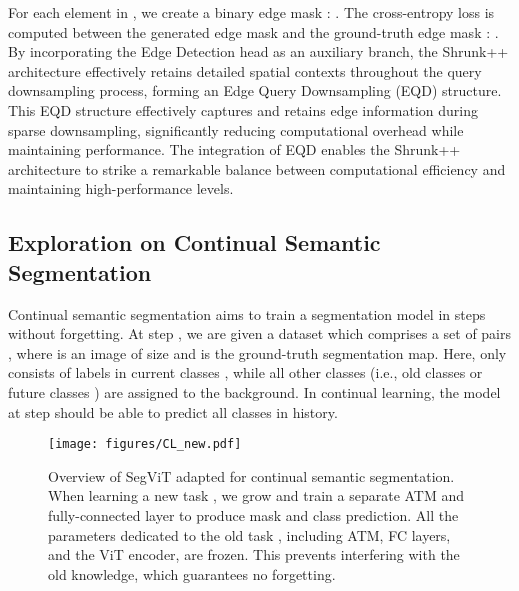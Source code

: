 For each element  in , we create a binary edge mask : .
The cross-entropy loss is computed between the generated edge mask  and the ground-truth edge mask :
.
By incorporating the Edge Detection head as an auxiliary branch, the Shrunk++ architecture effectively retains detailed spatial contexts throughout the query downsampling process, forming an Edge Query Downsampling (EQD) structure. This EQD structure effectively captures and retains edge information during sparse downsampling, significantly reducing computational overhead while maintaining performance.
The integration of EQD enables the Shrunk++ architecture to strike a remarkable balance between computational efficiency and maintaining high-performance levels.







\subsection{Exploration on Continual Semantic Segmentation}

Continual semantic segmentation aims to train a segmentation model in  steps without forgetting. At step , we are given a dataset  which comprises a set of pairs , 
where  is an image of size  and   is the ground-truth segmentation map.
Here,  only consists of labels in current classes , while all other classes (i.e., old classes  or future classes ) are assigned to the background. In continual learning, the model at step  should be able to predict all classes  in history.

\begin{figure*}[h]
    \centering
\texttt{[image: figures/CL\_new.pdf]}
    \caption{Overview of SegViT adapted for continual semantic segmentation. When learning a new task , we grow and train a separate ATM and fully-connected layer to produce mask and class prediction. All the parameters dedicated to the old task , including ATM, FC layers, and the ViT encoder, are frozen. This prevents interfering with the old knowledge, which guarantees no forgetting.}
    \label{fig:cl}
\end{figure*}

